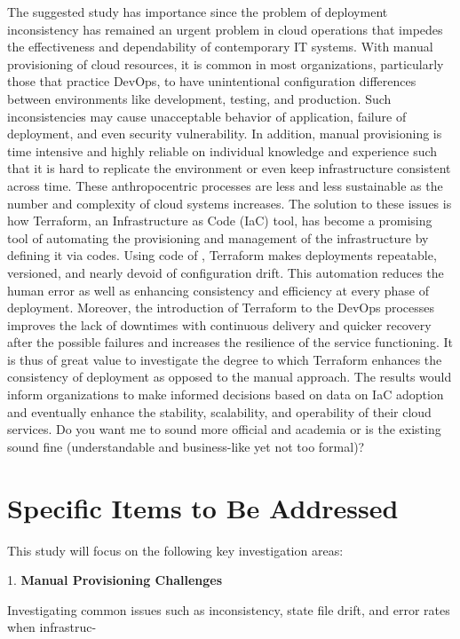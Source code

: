 \documentclass[10pt]{article}
\begin{document}
The suggested study has importance since the problem of deployment inconsistency has remained an urgent problem in cloud operations that impedes the effectiveness and dependability of contemporary IT systems. With manual provisioning of cloud resources, it is common in most organizations, particularly
those that practice DevOps, to have unintentional configuration differences between environments like development, testing, and production. Such inconsistencies may cause unacceptable behavior of application, failure of deployment, and even security vulnerability. In addition, manual provisioning is time
intensive and highly reliable on individual knowledge and experience such that it is hard to replicate the environment or even keep infrastructure consistent across time. These anthropocentric processes are less and less sustainable as the number and complexity of cloud systems increases. The solution
to these issues is how Terraform, an Infrastructure as Code (IaC) tool, has become a promising tool of automating the provisioning and management of the infrastructure by defining it via codes. Using code of , Terraform makes deployments repeatable, versioned, and nearly devoid of configuration drift. This automation reduces the human error as well as enhancing consistency and efficiency at every phase of deployment. Moreover, the introduction of Terraform to the DevOps processes improves the lack of downtimes with continuous delivery and quicker recovery after the possible failures and increases the resilience of the service functioning. It is thus of great value to investigate the degree to which Terraform enhances the consistency of deployment as opposed to the manual approach. The results would inform organizations to make informed decisions based on data on IaC adoption and eventually enhance the stability, scalability, and operability of their cloud services. Do you want me to sound more official and academia or is the existing sound fine (understandable and business-like yet not too formal)?

\section{Specific Items to Be Addressed
} 

This study will focus on the following key investigation areas:

1. \textbf{Manual Provisioning Challenges}

Investigating common issues such as inconsistency, state file drift, and error rates when infrastruc-
\end{document}
